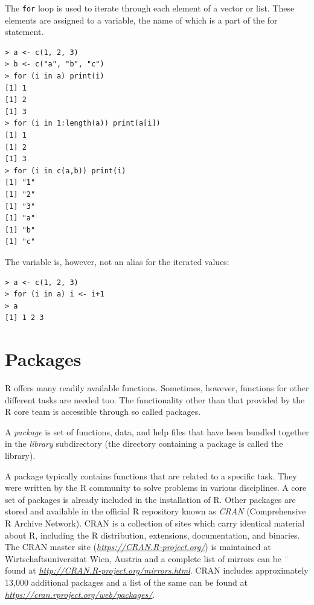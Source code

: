 The \texttt{for} loop is used to iterate through each element of a vector or list. These
elements are assigned to a variable, the name of which is a part of the for statement.

\begin{verbatim}
> a <- c(1, 2, 3)
> b <- c("a", "b", "c")
> for (i in a) print(i)
[1] 1
[1] 2
[1] 3
> for (i in 1:length(a)) print(a[i])
[1] 1
[1] 2
[1] 3
> for (i in c(a,b)) print(i)
[1] "1"
[1] "2"
[1] "3"
[1] "a"
[1] "b"
[1] "c"
\end{verbatim}

The variable is, however, not an alias for the iterated values:

\begin{verbatim}
> a <- c(1, 2, 3)
> for (i in a) i <- i+1
> a
[1] 1 2 3
\end{verbatim}

\section{Packages}

R offers many readily available functions. Sometimes, however, functions for
other different tasks are needed too. The functionality other than that provided
by the R core team is accessible through so called packages.

A \textit{package} is set of functions, data, and help files that have been bundled
together in the \textit{library} subdirectory (the directory containing a package is called
the library).

A package typically contains functions that are related to a specific task. They
were written by the R community to solve problems in various disciplines. A
core set of packages is already included in the installation of R. Other packages are stored and available in the official R repository known as \textit{CRAN} (Comprehensive R Archive Network). CRAN is a collection of sites which carry identical material about R, including the R distribution, extensions, documentation,
and binaries. The CRAN master site (\textit{\href{https://cran.r-project.org/}{https://CRAN.R-project.org/}}) is maintained
at Wirtschaftsuniversitat Wien, Austria and a complete list of mirrors can be ¨
found at \textit{\href{https://cran.r-project.org/}{http://CRAN.R-project.org/mirrors.html}}. CRAN includes approximately
13,000 additional packages and a list of the same can be found at \textit{\href{https://cran.r-project.org/}{https://cran.rproject.org/web/packages/}}.

